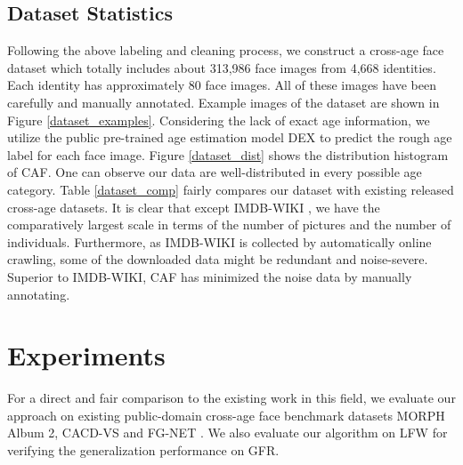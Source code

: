 \documentclass[runningheads]{llncs}
\begin{document}
\subsection{Dataset Statistics}
Following the above labeling and cleaning process, we construct a cross-age face dataset which totally includes about 313,986 face images from 4,668 identities. Each identity has approximately 80 face images.
All of these images have been carefully and manually annotated.
Example images of the dataset are shown in Figure \ref{dataset_examples}.
Considering the lack of exact age information, we utilize the public pre-trained age estimation model DEX \cite{imdb2} to predict the rough age label for each face image. Figure \ref{dataset_dist} shows the distribution histogram of CAF. One can observe our data are well-distributed in every possible age category. Table \ref{dataset_comp} fairly compares our dataset with existing released cross-age datasets. It is clear that except IMDB-WIKI \cite{imdb2}, we have the comparatively largest scale in terms of the number of pictures and the number of individuals. Furthermore, as IMDB-WIKI is collected by automatically online crawling, some of the downloaded data might be redundant and noise-severe.
Superior to IMDB-WIKI, CAF has minimized the noise data by manually annotating.





\section{Experiments}
\label{sec5}
For a direct and fair comparison to the existing work in this field, we evaluate our approach on existing public-domain cross-age face benchmark datasets MORPH Album 2\cite{morph}, CACD-VS \cite{cacd} and FG-NET \cite{fgnet}. We also evaluate our algorithm on LFW \cite{lfw} for verifying the generalization performance on GFR.
\end{document}
